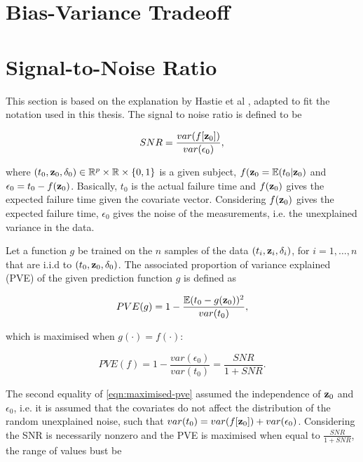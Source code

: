 \begin{appendices}
\section{Bias-Variance Tradeoff}\label{sec:bias-variance}


\section{Signal-to-Noise Ratio}\label{app:snr}

This section is based on the explanation by Hastie et al , adapted to fit the notation used in this thesis. The signal to noise ratio is defined to be

\begin{equation}
    SNR = \frac{var(f[\textbf{z}_0])}{var(\epsilon_0)},
\end{equation}

where $(t_0,\textbf{z}_0,\delta_0)\in\mathbb{R}^p\times\mathbb{R}\times\{0,1\}$ is a given subject, $f(\textbf{z}_0=\mathbb{E}(t_0|\textbf{z}_0)$ and $\epsilon_0 = t_0-f(\textbf{z}_0)$. Basically, $t_0$ is the actual failure time and $f(\textbf{z}_0)$ gives the expected failure time given the covariate vector. Considering $f(\textbf{z}_0)$ gives the expected failure time, $\epsilon_0$ gives the noise of the measurements, i.e. the unexplained variance in the data.

Let a function $g$ be trained on the $n$ samples of the data $(t_i, \textbf{z}_i, \delta_i)$, for $i=1,\ldots,n$ that are i.i.d to $(t_0, \textbf{z}_0, \delta_0)$. The associated proportion of variance explained (PVE) of the given prediction function $g$ is defined as

\begin{equation}
    PVE(g)=1-\frac{\mathbb{E}(t_0-g(\textbf{z}_0))^2}{var(t_0)},
\end{equation}

which is maximised when $g(\cdot)=f(\cdot)$:

\begin{equation}\label{eqn:maximised-pve}
    PVE(f)=1-\frac{var(\epsilon_0)}{var(t_0)}=\frac{SNR}{1+SNR}.
\end{equation}

The second equality of \cref{eqn:maximised-pve} assumed the independence of $\textbf{z}_0$ and $\epsilon_0$, i.e. it is assumed that the covariates do not affect the distribution of the random unexplained noise, such that $var(t_0)=var(f[\textbf{z}_0])+var(\epsilon_0)$. Considering the SNR is necessarily nonzero and the PVE is maximised when equal to $\frac{SNR}{1+SNR}$, the range of values bust be


\end{appendices}
